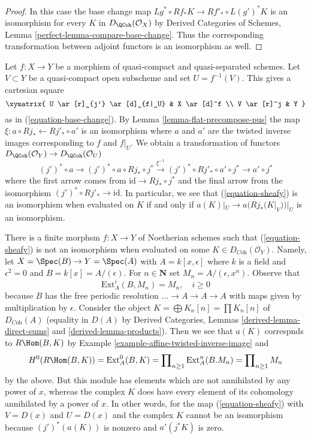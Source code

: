\begin{proof}
In this case the base change map
$Lg^* \circ Rf_* K \longrightarrow Rf'_* \circ L(g')^*K$
is an isomorphism for every $K$ in $D_\QCoh(\mathcal{O}_X)$ by
Derived Categories of Schemes, Lemma \ref{perfect-lemma-compare-base-change}.
Thus the corresponding transformation between adjoint functors
is an isomorphism as well.
\end{proof}

\noindent
Let $f : X \to Y$ be a morphism of quasi-compact and quasi-separated
schemes. Let $V \subset Y$ be a quasi-compact open subscheme and set
$U = f^{-1}(V)$. This gives a cartesian square
$$
\xymatrix{
U \ar[r]_{j'} \ar[d]_{f|_U} & X \ar[d]^f \\
V \ar[r]^j & Y
}
$$
as in (\ref{equation-base-change}). By Lemma \ref{lemma-flat-precompose-pus}
the map $\xi : a \circ Rj_* \leftarrow Rj'_* \circ a'$ is an isomorphism
where $a$ and $a'$ are the
twisted inverse images corresponding to $f$ and $f|_U$.
We obtain a transformation
of functors $D_\QCoh(\mathcal{O}_Y) \to D_\QCoh(\mathcal{O}_U)$
\begin{equation}
\label{equation-sheafy}
(j')^* \circ a \to
(j')^* \circ a \circ Rj_* \circ j^* \xrightarrow{\xi^{-1}}
(j')^* \circ Rj'_* \circ a' \circ j^* \to a' \circ j^*
\end{equation}
where the first arrow comes from $\text{id} \to Rj_* \circ j^*$
and the final arrow from the isomorphism $(j')^* \circ Rj'_* \to \text{id}$.
In particular, we see that (\ref{equation-sheafy}) is an isomorphism
when evaluated on $K$ if and only if $a(K)|_U \to a(Rj_*(K|_V))|_U$
is an isomorphism.

\begin{example}
\label{example-not-supported-on-inverse-image}
There is a finite morphsm $f : X \to Y$ of Noetherian schemes
such that (\ref{equation-sheafy}) is not an isomorphism
when evaluated on some
$K \in D_{\textit{Coh}}(\mathcal{O}_Y)$.
Namely, let $X = \Spec(B) \to Y = \Spec(A)$ with
$A = k[x, \epsilon]$ where $k$ is a field and $\epsilon^2 = 0$ and
$B = k[x] = A/(\epsilon)$. For $n \in \mathbf{N}$ set
$M_n = A/(\epsilon, x^n)$. Observe that
$$
\text{Ext}^i_A(B, M_n) = M_n,\quad i \geq 0
$$
because $B$ has the free periodic resolution
$\ldots \to A \to A \to A$ with maps given by multiplication by $\epsilon$.
Consider the object
$K = \bigoplus K_n[n] = \prod K_n[n]$
of $D_{\textit{Coh}}(A)$ (equality in $D(A)$ by
Derived Categories, Lemmas \ref{derived-lemma-direct-sums} and
\ref{derived-lemma-products}). Then we see that $a(K)$ correspnds
to $R\Hom(B, K)$ by Example \ref{example-affine-twisted-inverse-image} and
$$
H^0(R\Hom(B, K)) = \text{Ext}^0_A(B, K) =
\prod\nolimits_{n \geq 1} \text{Ext}^n_A(B. M_n) = 
\prod\nolimits_{n \geq 1} M_n
$$
by the above. But this module has elements which are not
annihilated by any power of $x$, whereas the complex $K$
does have every element of its cohomology annihilated by
a power of $x$. In other words, for the map (\ref{equation-sheafy})
with $V = D(x)$ and $U = D(x)$ and the complex $K$ cannot
be an isomorphism because $(j')^*(a(K))$ is nonzero and
$a'(j^*K)$ is zero.
\end{example}

